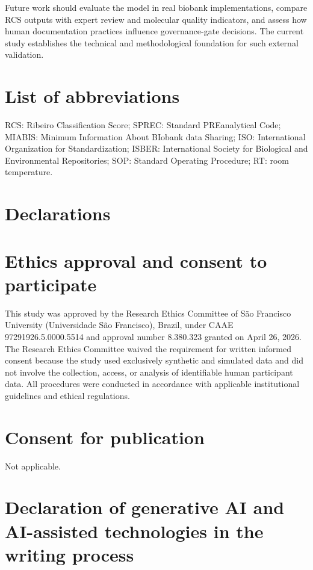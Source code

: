 \documentclass[preprint,12pt]{elsarticle}
\begin{document}
Future work should evaluate the model in real biobank implementations, compare RCS outputs with expert review and molecular quality 
indicators, and assess how human documentation practices influence governance-gate decisions. The current study establishes the technical and 
methodological foundation for such external validation.

\section*{List of abbreviations}

RCS: Ribeiro Classification Score; SPREC: Standard PREanalytical Code; MIABIS: Minimum Information About BIobank data Sharing; ISO: 
International Organization for Standardization; ISBER: International Society for Biological and Environmental Repositories; SOP: Standard 
Operating Procedure; RT: room temperature.

\section*{Declarations}

\section*{Ethics approval and consent to participate}

This study was approved by the Research Ethics Committee of São Francisco University (Universidade São Francisco), 
Brazil, under CAAE 97291926.5.0000.5514 and approval number 8.380.323 granted on April 26, 2026. The Research Ethics 
Committee waived the requirement for written informed consent because the study used exclusively synthetic and simulated 
data and did not involve the collection, access, or analysis of identifiable human participant data. All procedures were 
conducted in accordance with applicable institutional guidelines and ethical regulations.


\section*{Consent for publication}

Not applicable.

\section*{Declaration of generative AI and AI-assisted technologies in the writing process}
\end{document}
